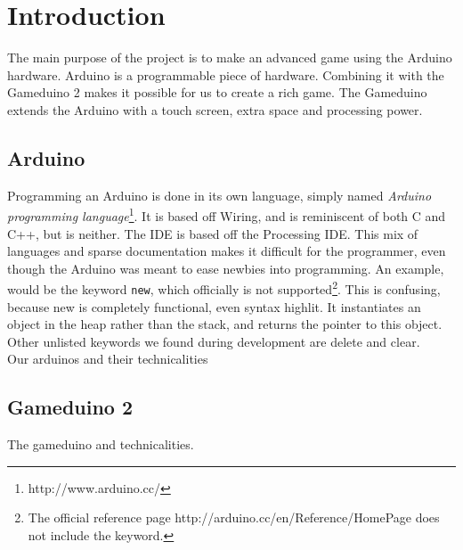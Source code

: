 \chapter{Introduction}
The main purpose of the project is to make an advanced game using the Arduino hardware.
Arduino is a programmable piece of hardware. Combining it with the  Gameduino 2 makes
it possible for us to create a rich game. The Gameduino extends the Arduino with a
touch screen, extra space and processing power.
\section{Arduino}
Programming an Arduino is done in its own language, simply named \emph{Arduino programming language}\footnote{http://www.arduino.cc/}. It is based off Wiring, and is reminiscent of both C and C++, but is neither. The IDE is based off the Processing IDE. This mix of languages and sparse documentation makes it difficult for the programmer, even though the Arduino was meant to ease newbies into programming. An example, would be the keyword {\tt new}, which officially is not supported\footnote{The official reference page http://arduino.cc/en/Reference/HomePage does not include the keyword.}. This is confusing, because new is completely functional, even syntax highlit. It instantiates an object in the heap rather than the stack, and returns the pointer to this object. Other unlisted keywords we found during development are delete and clear.\\ %
Our arduinos and their technicalities
\section{Gameduino 2}
The gameduino and technicalities.